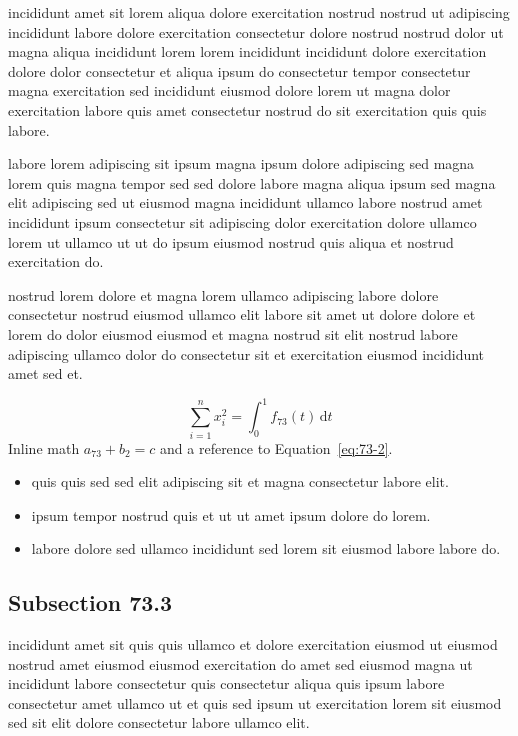 \documentclass{article}
\begin{document}
incididunt amet sit lorem aliqua dolore exercitation nostrud nostrud ut adipiscing incididunt labore dolore exercitation consectetur dolore nostrud nostrud dolor ut magna aliqua incididunt lorem lorem incididunt incididunt dolore exercitation dolore dolor consectetur et aliqua ipsum do consectetur tempor consectetur magna exercitation sed incididunt eiusmod dolore lorem ut magna dolor exercitation labore quis amet consectetur nostrud do sit exercitation quis quis labore.

labore lorem adipiscing sit ipsum magna ipsum dolore adipiscing sed magna lorem quis magna tempor sed sed dolore labore magna aliqua ipsum sed magna elit adipiscing sed ut eiusmod magna incididunt ullamco labore nostrud amet incididunt ipsum consectetur sit adipiscing dolor exercitation dolore ullamco lorem ut ullamco ut ut do ipsum eiusmod nostrud quis aliqua et nostrud exercitation do.

nostrud lorem dolore et magna lorem ullamco adipiscing labore dolore consectetur nostrud eiusmod ullamco elit labore sit amet ut dolore dolore et lorem do dolor eiusmod eiusmod et magna nostrud sit elit nostrud labore adipiscing ullamco dolor do consectetur sit et exercitation eiusmod incididunt amet sed et.

\begin{equation}\label{eq:73-2}
  \sum_{i=1}^{n} x_i^{2} = \int_0^1 f_{73}(t)\,\mathrm{d}t
\end{equation}
Inline math $a_{73} + b_{2} = c$ and a reference to Equation~\eqref{eq:73-2}.

\begin{itemize}
  \item quis quis sed sed elit adipiscing sit et magna consectetur labore elit.
  \item ipsum tempor nostrud quis et ut ut amet ipsum dolore do lorem.
  \item labore dolore sed ullamco incididunt sed lorem sit eiusmod labore labore do.
\end{itemize}

\subsection{Subsection 73.3}\label{sec:73-3}
incididunt amet sit quis quis ullamco et dolore exercitation eiusmod ut eiusmod nostrud amet eiusmod eiusmod exercitation do amet sed eiusmod magna ut incididunt labore consectetur quis consectetur aliqua quis ipsum labore consectetur amet ullamco ut et quis sed ipsum ut exercitation lorem sit eiusmod sed sit elit dolore consectetur labore ullamco elit.
\end{document}
